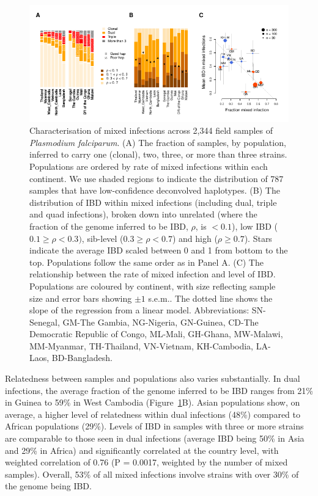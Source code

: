 \documentclass[9pt,lineno]{elife}
\begin{document}
\begin{figure}[ht]
  \begin{center}
    \includegraphics[width=\textwidth]{Fig3.pdf}
    \caption{Characterisation of mixed infections across 2,344 field samples of {\it Plasmodium falciparum}. (A) The fraction of samples, by population, inferred to carry one (clonal), two, three, or more than three strains.  Populations are ordered by rate of mixed infections within each continent. We use shaded regions to indicate the distribution of 787 samples that have low-confidence deconvolved haplotypes.  (B) The distribution of IBD within mixed infections (including dual, triple and quad infections), broken down into unrelated (where the fraction of the genome inferred to be IBD, $\rho$, is $< 0.1$), low IBD ($0.1 \geq \rho < 0.3)$, sib-level ($0.3 \geq \rho <0.7$) and high ($\rho \geq 0.7$). Stars indicate the average IBD scaled between 0 and 1 from bottom to the top.  Populations follow the same order as in Panel A.  (C) The relationship between the rate of mixed infection and level of IBD. Populations are coloured by continent, with size reflecting sample size and error bars showing $\pm 1$ s.e.m..  The dotted line shows the slope of the regression from a linear model.  Abbreviations: SN-Senegal, GM-The Gambia, NG-Nigeria, GN-Guinea, CD-The Democratic Republic of Congo, ML-Mali, GH-Ghana, MW-Malawi, MM-Myanmar, TH-Thailand, VN-Vietnam, KH-Cambodia, LA-Laos, BD-Bangladesh.} \label{fig:mixInfPlot}
  \end{center}
\end{figure}

Relatedness between samples and populations also varies substantially.  In dual infections, the average fraction of the genome inferred to be IBD ranges from 21\% in Guinea to 59\% in West Cambodia (Figure~\ref{fig:mixInfPlot}B).  Asian populations show, on average, a higher level of relatedness within dual infections (48\%) compared to African populations (29\%).  Levels of IBD in samples with three or more strains are comparable to those seen in dual infections (average IBD being 50\% in Asia and 29\% in Africa) and significantly correlated at the country level, with weighted correlation of 0.76 (P = 0.0017, weighted by the number of mixed samples).  Overall, 53\% of all mixed infections involve strains with over 30\% of the genome being IBD.
\end{document}
